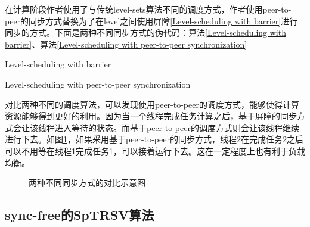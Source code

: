 在计算阶段作者使用了与传统level-sets算法不同的调度方式，作者使用peer-to-peer的同步方式替换为了在level之间使用屏障\ref{Level-scheduling with barrier}进行同步的方式。下面是两种不同同步方式的伪代码：算法\ref{Level-scheduling with barrier}、算法\ref{Level-scheduling with peer-to-peer synchronization}

\begin{algorithm}
    \caption{Level-scheduling with barrier}
    \label{Level-scheduling with barrier}
\end{algorithm}
\begin{algorithm}
    \caption{Level-scheduling with peer-to-peer synchronization}
    \label{Level-scheduling with peer-to-peer synchronization}
\end{algorithm}

对比两种不同的调度算法，可以发现使用peer-to-peer的调度方式，能够使得计算资源能够得到更好的利用。因为当一个线程完成任务计算之后，基于屏障的同步方式会让该线程进入等待的状态。而基于peer-to-peer的调度方式则会让该线程继续进行下去。如图\ref{两种不同同步方式的对比示意图}，如果采用基于peer-to-peer的同步方式，线程2在完成任务2之后可以不用等在线程1完成任务1，可以接着运行下去。这在一定程度上也有利于负载均衡。

\begin{figure}[htbp]
    \caption{两种不同同步方式的对比示意图}
    \label{两种不同同步方式的对比示意图}
    \centering
    \centering
\end{figure}

\subsection{sync-free的SpTRSV算法}

